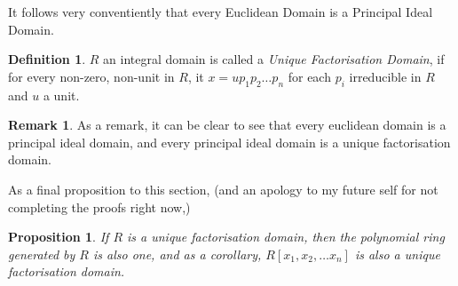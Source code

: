 \documentclass[12pt]{book}
\newtheorem{proposition}{Proposition}[section]
\theoremstyle{definition}
\newtheorem*{definition}{Definition}
\newtheorem*{remark}{Remark}
\begin{document}
It follows very conventiently that every Euclidean Domain is a Principal Ideal Domain.
\begin{definition}
    $R$ an integral domain is called a \textit{Unique Factorisation Domain}, if for every non-zero, non-unit in $R$, it $x = up_1p_2\ldots p_n$ for each $p_i$ irreducible in $R$ and $u$ a unit.
\end{definition}
\begin{remark}
    As a remark, it can be clear to see that every euclidean domain is a principal ideal domain, and every principal ideal domain is a unique factorisation domain.
\end{remark}
As a final proposition to this section, (and an apology to my future self for not completing the proofs right now,)
\begin{proposition}
    If $R$ is a unique factorisation domain, then the polynomial ring generated by $R$ is also one, and as a corollary, $R[x_1, x_2, \ldots x_n]$ is also a unique factorisation domain.
\end{proposition}
\end{document}
